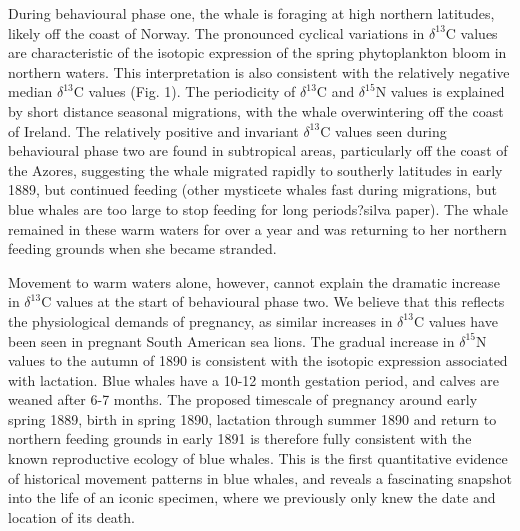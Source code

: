 \documentclass[a4paper,12pt]{article}
\begin{document}
During behavioural phase one, the whale is foraging at high northern latitudes, likely off the coast of Norway. 
The pronounced cyclical variations in $\delta^{13}$C values are characteristic of the isotopic expression of the spring phytoplankton bloom in northern waters\cite{magozzi2017using}. 
This interpretation is also consistent with the relatively negative median $\delta^{13}$C values (Fig. 1). 
The periodicity of $\delta^{13}$C and $\delta^{15}$N values is explained by short distance seasonal migrations, with the whale overwintering off the coast of Ireland. 
The relatively positive and invariant $\delta^{13}$C values seen during behavioural phase two are found in subtropical areas, particularly off the coast of the Azores, suggesting the whale migrated rapidly to southerly latitudes in early 1889, but continued feeding (other mysticete whales fast during migrations, but blue whales are too large to stop feeding for long periods\cite{busquets2017estimating}?silva paper). 
The whale remained in these warm waters for over a year and was returning to her northern feeding grounds when she became stranded. 
 
Movement to warm waters alone, however, cannot explain the dramatic increase in $\delta^{13}$C values at the start of behavioural phase two. 
We believe that this reflects the physiological demands of pregnancy, as similar increases in $\delta^{13}$C values have been seen in pregnant South American sea lions\cite{cardona2017temporal}. 
The gradual increase in $\delta^{15}$N values to the autumn of 1890 is consistent with the isotopic expression associated with lactation\cite{cardona2017temporal}. Blue whales have a 10-12 month gestation period, and calves are weaned after 6-7 months\cite{handbook}. 
The proposed timescale of pregnancy around early spring 1889, birth in spring 1890, lactation through summer 1890 and return to northern feeding grounds in early 1891 is therefore fully consistent with the known reproductive ecology of blue whales. 
This is the first quantitative evidence of historical movement patterns in blue whales, and reveals a fascinating snapshot into the life of an iconic specimen, where we previously only knew the date and location of its death. 
 
\end{document}
